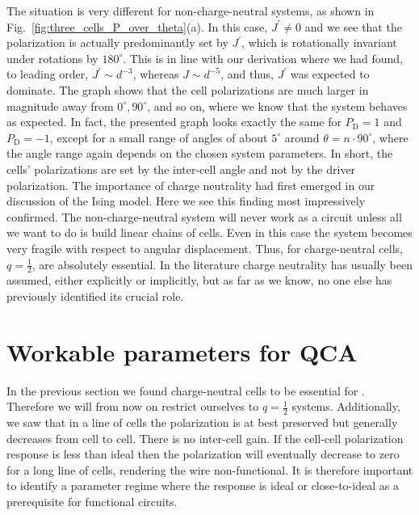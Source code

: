 The situation is very different for non-charge-neutral systems, as shown in
Fig.~\ref{fig:three_cells_P_over_theta}(a). In this case, $J^{\prime} \ne 0$ and
we see that the polarization is actually predominantly set by $J^{\prime}$,
which is rotationally invariant under rotations by $180^{\circ}$. This is in
line with our derivation where we had found, to leading order, $J^{\prime} \sim
d^{-3}$, whereas $J \sim d^{-5}$, and thus, $J^{\prime}$ was expected to
dominate. The graph shows that the cell polarizations are much larger in
magnitude away from $0^{\circ}, 90^{\circ}$, and so on, where we know that the
system behaves as expected. In fact, the presented graph looks exactly the same
for $P_\text{D} = 1$ and $P_\text{D} = -1$, except for a small range of angles of about
$5^{\circ}$ around $\theta = n \cdot 90^{\circ}$, where the angle range again
depends on the chosen system parameters. In short, the cells' polarizations are
set by the inter-cell angle and not by the driver polarization. The importance
of charge neutrality had first emerged in our discussion of the Ising model.
Here we see this finding most impressively confirmed. The non-charge-neutral
system will never work as a  circuit unless all we want to do is build linear
chains of cells. Even in this case the system becomes very fragile with respect
to angular displacement. Thus, for  charge-neutral cells, $q=\frac{1}{2}$,
are absolutely essential. In the literature charge neutrality has usually been
assumed, either explicitly or implicitly, but as far as we know, no one else has
previously identified its crucial role.


\section{Workable parameters for QCA}

In the previous section we found charge-neutral cells to be essential for
. Therefore we will from now on restrict ourselves to $q=\frac{1}{2}$
systems. Additionally, we saw that in a line of cells the polarization is at
best preserved but generally decreases from cell to cell. There is no inter-cell
gain. If the cell-cell polarization response is less than ideal then the
polarization will eventually decrease to zero for a long line of cells,
rendering the wire non-functional. It is therefore important to identify a
parameter regime where the response is ideal or close-to-ideal as a prerequisite
for functional  circuits.

